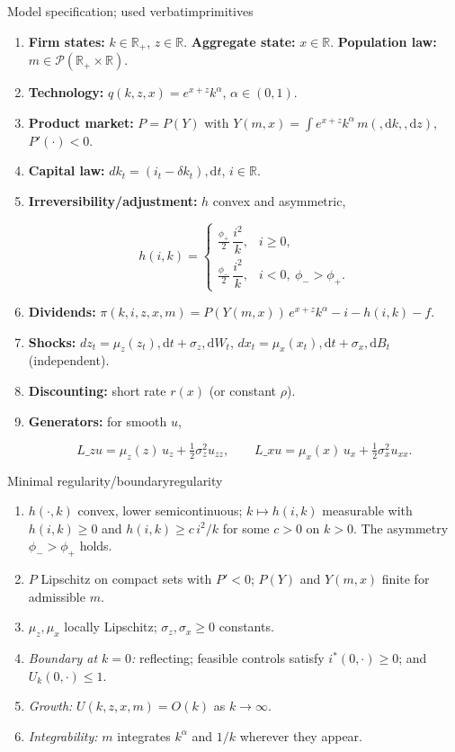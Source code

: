 ﻿\documentclass[11pt,letterpaper,oneside]{article}
\numberwithin{equation}{section}
\newcommand{\R}{\mathbb{R}}
\newcommand{\1}{\mathbf{1}}
\newcommand{\diff}{,\mathrm{d}}
\newcommand{\Lz}{L\_z}
\newcommand{\Lx}{L\_x}
\newcommand{\YY}{Y(m,x)}
\begin{document}
\begin{assumption}{Model specification; used verbatim}{primitives}
\begin{enumerate}[label=(\roman*),itemsep=0.25em]
\item \textbf{Firm states:} $k\in\R_+$, $z\in\R$. \textbf{Aggregate state:} $x\in\R$. \textbf{Population law:} $m\in\mathcal P(\R_+\times\R)$.
\item \textbf{Technology:} $q(k,z,x)=e^{x+z}k^\alpha$, $\alpha\in(0,1)$.
\item \textbf{Product market:} $P=P(Y)$ with $Y(m,x)=\int e^{x+z}k^\alpha\, m(\diff k,\diff z)$, $P'(\cdot)<0$.
\item \textbf{Capital law:} $dk_t=(i_t-\delta k_t)\diff t$, $i\in\R$.
\item \textbf{Irreversibility/adjustment:} $h$ convex and asymmetric,

$$
h(i,k)=
\begin{cases}
\tfrac{\phi_+}{2}\,\dfrac{i^2}{k}, & i\ge 0,\\[3pt]
\tfrac{\phi_-}{2}\,\dfrac{i^2}{k}, & i<0,\ \phi_->\phi_+.
\end{cases}
$$

\item \textbf{Dividends:} $\pi(k,i,z,x,m)=P(\YY)\,e^{x+z}k^\alpha - i - h(i,k) - f$.
\item \textbf{Shocks:} $dz_t=\mu_z(z_t)\diff t+\sigma_z\diff W_t$, $dx_t=\mu_x(x_t)\diff t+\sigma_x\diff B_t$ (independent).
\item \textbf{Discounting:} short rate $r(x)$ (or constant $\rho$).
\item \textbf{Generators:} for smooth $u$,

$$
\Lz u=\mu_z(z)\,u_z+\tfrac12\sigma_z^2 u_{zz},\qquad
\Lx u=\mu_x(x)\,u_x+\tfrac12\sigma_x^2 u_{xx}.
$$

\end{enumerate}
\end{assumption}

\begin{assumption}{Minimal regularity/boundary}{regularity}
\begin{enumerate}[label=(\alph*),itemsep=0.2em]
\item $h(\cdot,k)$ convex, lower semicontinuous; $k\mapsto h(i,k)$ measurable with $h(i,k)\ge 0$ and $h(i,k)\ge c\,i^2/k$ for some $c>0$ on $k>0$. The asymmetry $\phi_->\phi_+$ holds.
\item $P$ Lipschitz on compact sets with $P'<0$; $P(Y)$ and $Y(m,x)$ finite for admissible $m$.
\item $\mu_z,\mu_x$ locally Lipschitz; $\sigma_z,\sigma_x\ge 0$ constants.
\item \emph{Boundary at $k=0$:} reflecting; feasible controls satisfy $i^*(0,\cdot)\ge 0$; and $U_k(0,\cdot)\le 1$.
\item \emph{Growth:} $U(k,z,x,m)=O(k)$ as $k\to\infty$.
\item \emph{Integrability:} $m$ integrates $k^\alpha$ and $1/k$ wherever they appear.
\end{enumerate}
\end{assumption}
\end{document}
